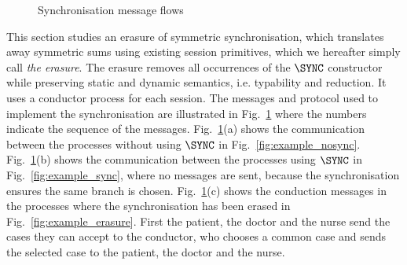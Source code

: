 \newcommand{\eraseGk}[1]{\ensuremath{\left\llbracket #1 \right\rrbracket}}
\newcommand{\eraseUk}[1]{\ensuremath{\left\llbracket #1 \right\rrbracket}}
\newcommand{\eraseTk}[1]{\ensuremath{\left\llbracket #1 \right\rrbracket}}
\newcommand{\erasePk}[1]{\ensuremath{\mathcal{E}\left\llbracket #1 \right\rrbracket}}
\newcommand{\eraseCk}[1]{\ensuremath{\mathcal{C}\left\llbracket #1 \right\rrbracket}}
\newcommand{\eraseGammak}[1]{\ensuremath{\left\llbracket #1 \right\rrbracket}}
\newcommand{\eraseDeltak}[1]{\ensuremath{\left\llbracket #1 \right\rrbracket}}
\begin{figure}[t] \begin{center}
\end{center}
\vspace{-5mm}
\caption{Synchronisation message flows}
\label{fig:choice}
\end{figure} This section studies an erasure of symmetric synchronisation, which 
translates away symmetric sums using existing session primitives, which we
hereafter simply call {\em the erasure}. The erasure removes all occurrences of
the $\SYNC$ constructor while preserving static and dynamic semantics, i.e.
typability and reduction. It uses a conductor process for each
session. The messages and protocol used to implement the
synchronisation are illustrated in Fig.~\ref{fig:choice} where the numbers
indicate the sequence of the messages.
Fig.~\ref{fig:choice}(a) shows the communication between the processes
without using $\SYNC$ in Fig.~\ref{fig:example_nosync}.
Fig.~\ref{fig:choice}(b) shows the communication between the processes
using $\SYNC$ in Fig.~\ref{fig:example_sync}, where no messages are sent, because
the synchronisation ensures the same branch is chosen.
Fig.~\ref{fig:choice}(c) shows the conduction messages in the
processes where the synchronisation has been erased in
Fig.~\ref{fig:example_erasure}. First the patient, the doctor and the
nurse send the cases they can accept to the conductor, who chooses a common
case and sends the selected case to the patient, the doctor and the nurse.

